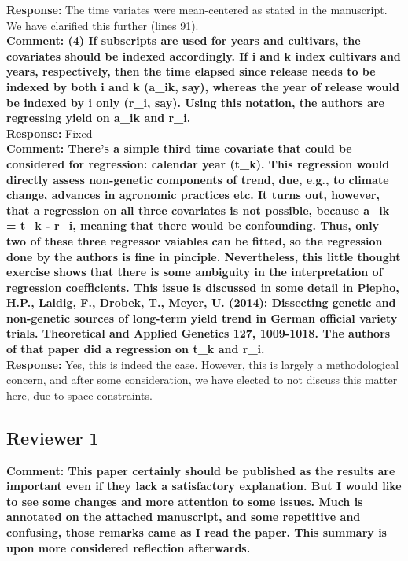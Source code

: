 \documentclass{article} \usepackage[margin=1in]{geometry}
\begin{document}
\textbf{Response:} The time variates were mean-centered as stated in the
manuscript. We have clarified this further (lines 91).\\

\textbf{Comment: (4) If subscripts are used for years and cultivars, the covariates
  should be indexed accordingly. If i and k index cultivars and years,
  respectively, then the time elapsed since release needs to be indexed
  by both i and k (a\_ik, say), whereas the year of release would be
  indexed by i only (r\_i, say). Using this notation, the authors are
  regressing yield on a\_ik and r\_i.}\\

\textbf{Response:} Fixed\\

\textbf{Comment: There's a simple third time
  covariate that could be considered for regression: calendar year
  (t\_k). This regression would directly assess non-genetic components
  of trend, due, e.g., to climate change, advances in agronomic
  practices etc. It turns out, however, that a regression on all three
  covariates is not possible, because a\_ik = t\_k - r\_i, meaning that
  there would be confounding. Thus, only two of these three regressor
  vaiables can be fitted, so the regression done by the authors is fine
  in pinciple.  Nevertheless, this little thought exercise shows that
  there is some ambiguity in the interpretation of regression
  coefficients. This issue is discussed in some detail in
  Piepho, H.P., Laidig, F., Drobek, T., Meyer, U. (2014): Dissecting
  genetic and non-genetic sources of long-term yield trend in German
  official variety trials. Theoretical and Applied Genetics 127,
  1009-1018. The authors of that paper did a regression on t\_k and r\_i.}\\

\textbf{Response:} Yes, this is indeed the case. However, this is
largely a methodological concern, and after some consideration, we have
elected to not discuss this matter here, due to space constraints.\\

\subsection{Reviewer 1}

\textbf{Comment: This paper certainly should be published as the results are
  important even if they lack a satisfactory explanation. But I would
  like to see some changes and more attention to some issues. Much is
  annotated on the attached manuscript, and some repetitive and
  confusing, those remarks came as I read the paper. This summary is
  upon more considered reflection afterwards.}
\end{document}
